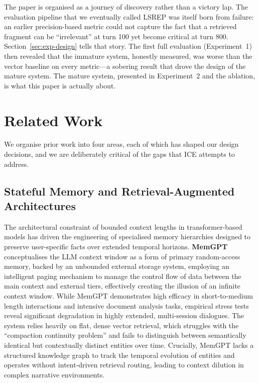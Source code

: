 \documentclass[11pt,a4paper]{article}
\begin{document}
The paper is organised as a journey of discovery rather than a victory lap. The evaluation pipeline that we eventually called LSREP was itself born from failure: an earlier precision-based metric could not capture the fact that a retrieved fragment can be ``irrelevant'' at turn 100 yet become critical at turn 800. Section~\ref{sec:exp-design} tells that story. The first full evaluation (Experiment~1) then revealed that the immature system, honestly measured, was worse than the vector baseline on every metric---a sobering result that drove the design of the mature system. The mature system, presented in Experiment~2 and the ablation, is what this paper is actually about.

\section{Related Work}
\label{sec:related-work}

We organise prior work into four areas, each of which has shaped our design decisions, and we are deliberately critical of the gaps that ICE attempts to address.

\subsection{Stateful Memory and Retrieval-Augmented Architectures}

The architectural constraint of bounded context lengths in transformer-based models has driven the engineering of specialised memory hierarchies designed to preserve user-specific facts over extended temporal horizons. \textbf{MemGPT} \citep{packer2023memgpt} conceptualises the LLM context window as a form of primary random-access memory, backed by an unbounded external storage system, employing an intelligent paging mechanism to manage the control flow of data between the main context and external tiers, effectively creating the illusion of an infinite context window. While MemGPT demonstrates high efficacy in short-to-medium length interactions and intensive document analysis tasks, empirical stress tests reveal significant degradation in highly extended, multi-session dialogues. The system relies heavily on flat, dense vector retrieval, which struggles with the ``compaction continuity problem'' and fails to distinguish between semantically identical but contextually distinct entities over time. Crucially, MemGPT lacks a structured knowledge graph to track the temporal evolution of entities and operates without intent-driven retrieval routing, leading to context dilution in complex narrative environments.
\end{document}
